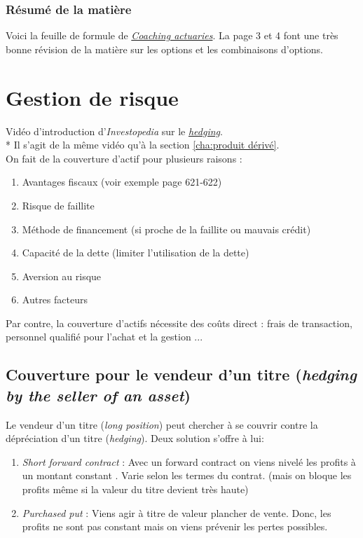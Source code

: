 \documentclass[11pt,french]{report}
\begin{document}
\subsection{Résumé de la matière}
\label{sec:résumé}

Voici la feuille de formule de \href{https://drive.google.com/open?id=0B6kXivc6X9LIdkRnU09RS0VTRjA}{\textit{Coaching actuaries}}. La page 3 et 4 font une très bonne révision de la matière sur les options et les combinaisons d'options. 





\chapter{Gestion de risque}
\label{chap:risk management}

Vidéo d'introduction d'\emph{Investopedia} sur le \href{http://www.investopedia.com/terms/h/hedge.asp?o=40186&l=dir&qsrc=999&qo=investopediaSiteSearch}{\emph{hedging}}.
\\ * Il s'agit de la même vidéo qu'à la section \ref{cha:produit dérivé}.
\\ On fait de la couverture d'actif pour plusieurs raisons :
\begin{enumerate}
\item Avantages fiscaux (voir exemple page 621-622)
\item Risque de faillite 
\item Méthode de financement (si proche de la faillite ou mauvais crédit)
\item Capacité de la dette (limiter l'utilisation de la dette)
\item Aversion au risque
\item Autres facteurs 
\end{enumerate}
Par contre, la couverture d'actifs nécessite des coûts direct : frais de transaction, personnel qualifié pour l'achat et la gestion ...

\section{Couverture pour le vendeur d'un titre (\emph{hedging by the seller of an asset})}
\label{sec:hedging seller}

Le vendeur d'un titre (\emph{long position}) peut chercher à se couvrir contre la dépréciation d'un titre (\emph{hedging}). Deux solution s'offre à lui:
\begin{enumerate}
\item \emph{Short forward contract} : Avec un forward contract on viens nivelé les profits à un montant constant . Varie selon les termes du contrat. (mais on bloque les profits même si la valeur du titre devient très haute)
\item \emph{Purchased put} : Viens agir à titre de valeur plancher de vente. Donc, les profits ne sont pas constant mais on viens prévenir les pertes possibles.
\end{enumerate}
\end{document}
